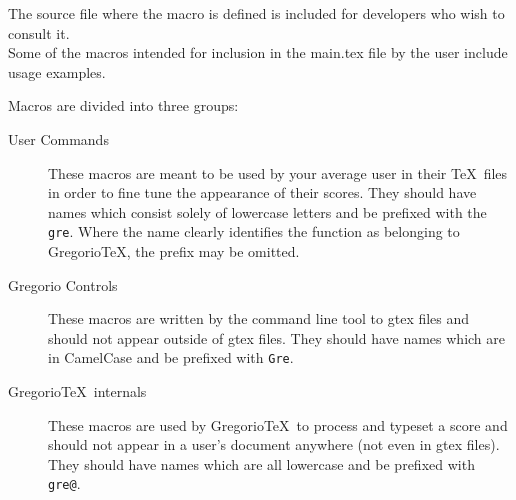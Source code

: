 \documentclass[12pt,a4paper]{article}
\begin{document}
The source file where the macro is defined is included for developers
who wish to consult it.\\
Some of the macros intended for inclusion in the main.tex file by the user
include usage examples.

Macros are divided into three groups:
\begin{description}
\item[User Commands] These macros are meant to be used by your average user in their \TeX\ files in order to fine tune the appearance of their scores.  They should have names which consist solely of lowercase letters and be prefixed with the \texttt{gre}.  Where the name clearly identifies the function as belonging to Gregorio\TeX, the prefix may be omitted.
\item[Gregorio Controls] These macros are written by the command line tool to gtex files and should not appear outside of gtex files.  They should have names which are in CamelCase and be prefixed with \texttt{Gre}.
\item[Gregorio\TeX\ internals] These macros are used by Gregorio\TeX\ to process and typeset a score and should not appear in a user's document anywhere (not even in gtex files).  They should have names which are all lowercase and be prefixed with \makeatletter\texttt{gre@}\makeatother.
\end{description}







\begin{appendices}
  \renewcommand\thetable{\thesection\arabic{table}}
  \renewcommand\thefigure{\thesection\arabic{figure}}
  
\end{appendices}

\printindex
\end{document}
